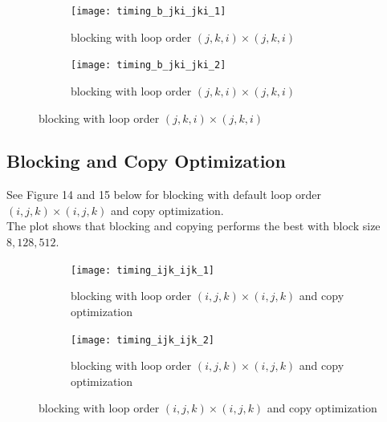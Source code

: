 \documentclass[12pt]{article}
\numberwithin{equation}{section}
\begin{document}
\begin{figure}[!ht]
   \begin{subfigure}
      \centering
        \begin{center}
      \texttt{[image: timing\_b\_jki\_jki\_1]}
        \end{center}
      \label{aload0}
      \caption{blocking with loop order $(j, k, i)\times(j, k, i)$}
  \end{subfigure}
  \begin{subfigure}
      \centering
        \begin{center}
      \texttt{[image: timing\_b\_jki\_jki\_2]}
        \end{center}
      \label{aload1}
      \caption{blocking with loop order $(j, k, i)\times(j, k, i)$}
  \end{subfigure}

\end{figure}





\subsection{Blocking and Copy Optimization}

See Figure 14 and 15 below for blocking with default loop order $(i, j, k)\times(i, j, k)$ and copy optimization.
\\
The plot shows that blocking and copying performs the best with block size $8, 128, 512$.

\begin{figure}[!ht]
   \begin{subfigure}
      \centering
        \begin{center}
      \texttt{[image: timing\_ijk\_ijk\_1]}
        \end{center}
      \label{aload0}
      \caption{blocking with loop order $(i, j, k)\times(i, j, k)$ and copy optimization}
  \end{subfigure}
  \begin{subfigure}
      \centering
        \begin{center}
      \texttt{[image: timing\_ijk\_ijk\_2]}
        \end{center}
      \label{aload1}
      \caption{blocking with loop order $(i, j, k)\times(i, j, k)$ and copy optimization}
  \end{subfigure}

\end{figure}
\end{document}
